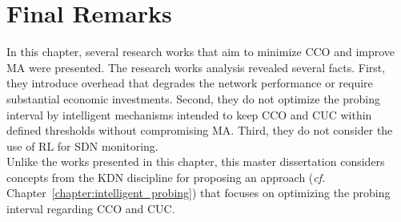\section{Final Remarks}
\label{sec:final_remarks_kap3}

In this chapter, several research works that aim to minimize CCO and improve MA were presented. The research works analysis revealed several facts. First, they introduce overhead that degrades the network performance or require substantial economic investments. Second, they do not optimize the probing interval by intelligent mechanisms intended to keep CCO and CUC within defined thresholds without compromising MA. Third, they do not consider the use of RL for SDN monitoring.\\

Unlike the works presented in this chapter, this master dissertation considers concepts from the KDN discipline for proposing an approach (\textit{cf.} Chapter~\ref{chapter:intelligent_probing}) that focuses on optimizing the probing interval regarding CCO and CUC.

